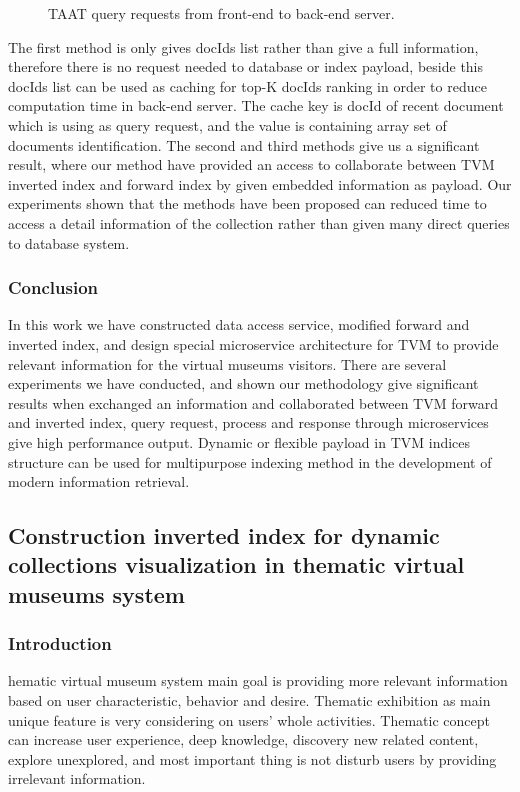 \begin{figure}[ht]
	\caption{TAAT query requests from front-end to back-end server.}\label{fig:taatQuery}
\end{figure}

The first method is only gives docIds list rather than give a full information, therefore there is no request needed to database or index payload, beside this docIds list can be used as caching for top-K docIds ranking in order to reduce computation time in back-end server. The cache key is docId of recent document which is using as query request, and the value is containing array set of documents identification. The second and third methods give us a significant result, where our method have provided an access to collaborate between TVM inverted index and forward index by given embedded information as payload. Our experiments shown that the methods have been proposed can reduced time to access a detail information of the collection rather than given many direct queries to database system.

\subsubsection{Conclusion} In this work we have constructed data access service, modified forward and inverted index, and design special microservice architecture for TVM to provide relevant information for the virtual museums visitors. There are several experiments we have conducted, and shown our methodology give significant results when exchanged an information and collaborated between TVM forward and inverted index, query request, process and response through microservices give high performance output. Dynamic or flexible payload in TVM indices structure can be used for multipurpose indexing method in the development of modern information retrieval.

\subsection{Construction inverted index for dynamic collections visualization in thematic virtual museums system}\label{subsec:ch4/sec2/sub2}

\subsubsection{Introduction}

hematic virtual museum system main goal is providing more relevant information based on user characteristic, behavior and desire. Thematic exhibition as main unique feature is very considering on users’ whole activities. Thematic concept can increase user experience, deep knowledge, discovery new related content, explore unexplored, and most important thing is not disturb users by providing irrelevant information.

